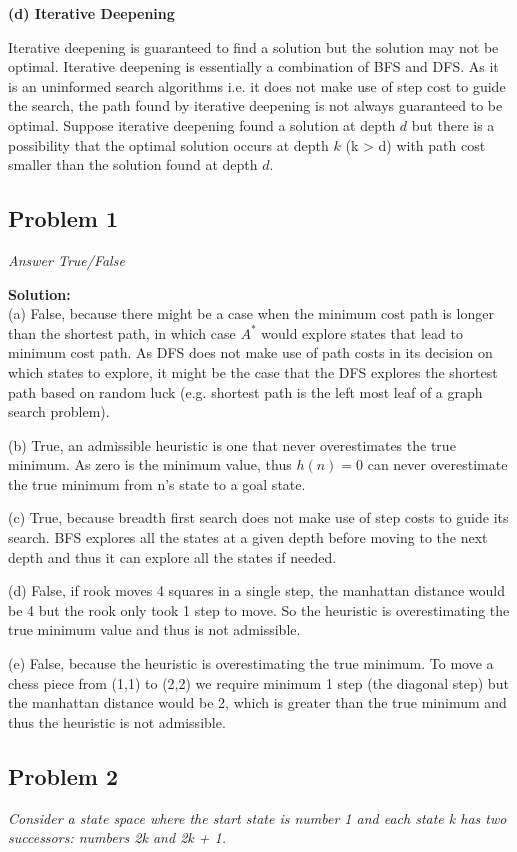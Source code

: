 \documentclass[12pt,a4paper]{article}
\newcommand{\solution}{\noindent\textbf{Solution:}\\}
\begin{document}
\noindent\textbf{(d) Iterative Deepening}

Iterative deepening is guaranteed to find a solution but the solution may not be optimal. Iterative deepening is essentially a combination of BFS and DFS. As it is an uninformed search algorithms i.e. it does not make use of step cost to guide the search, the path found by iterative deepening is not always guaranteed to be optimal. Suppose iterative deepening found a solution at depth $d$ but there is a possibility that the optimal solution occurs at depth $k$ (k > d) with path cost smaller than the solution found at depth $d$.

\newpage
\subsection*{Problem 1}
\textit{
    Answer True/False
}

\solution
    
(a) False, because there might be a case when the minimum cost path is longer than the shortest path, in which case $A^*$ would explore states that lead to minimum cost path. As DFS does not make use of path costs in its decision on which states to explore, it might be the case that the DFS explores the shortest path based on random luck (e.g. shortest path is the left most leaf of a graph search problem).

(b) True, an admissible heuristic is one that never overestimates the true minimum. As zero is the minimum value, thus $h(n) = 0$ can never overestimate the true minimum from n's state to a goal state.

(c) True, because breadth first search does not make use of step costs to guide its search. BFS explores all the states at a given depth before moving to the next depth and thus it can explore all the states if needed.

(d) False, if rook moves 4 squares in a single step, the manhattan distance would be 4 but the rook only took 1 step to move. So the heuristic is overestimating the true minimum value and thus is not admissible.

(e) False, because the heuristic is overestimating the true minimum. To move a chess piece from (1,1) to (2,2) we require minimum 1 step (the diagonal step) but the manhattan distance would be 2, which is greater than the true minimum and thus the heuristic is not admissible.

\newpage
\subsection*{Problem 2}
\textit{
    Consider a state space where the start state is number 1 and each state k has two successors: numbers 2k and 2k + 1.
}
\end{document}
